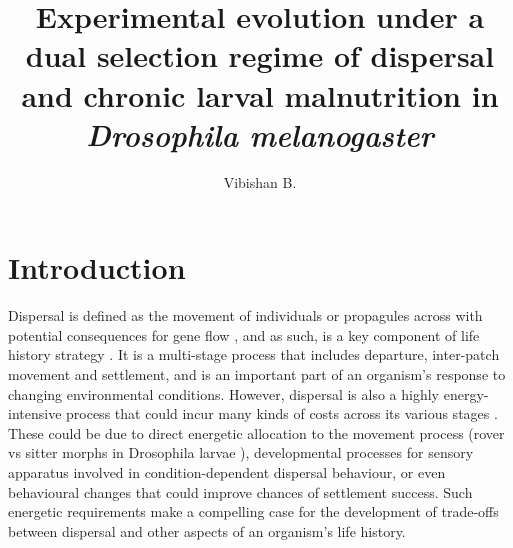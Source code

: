 \documentclass[12pt,onecolumn,twoside]{article}
\author{Vibishan B.}
\affil{Department of Biology, Indian Institute of Science Education and Research (IISER), Pune}
\title{Experimental evolution under a dual selection regime of dispersal and chronic larval malnutrition in \textit{Drosophila melanogaster}}
\date{\empty}
\begin{document}
	\maketitle
	\section{Introduction}

	Dispersal is defined as the movement of individuals or propagules across with potential consequences for gene flow \citep{Ronce2007}, and as such, is a key component of life history strategy \citep{Clobert2012, Bonte2017}. It is a multi-stage process that includes departure, inter-patch movement and settlement, and is an important part of an organism's response to changing environmental conditions. However, dispersal is also a highly energy-intensive process that could incur many kinds of costs across its various stages \citep{Bonte2012}. These could be due to direct energetic allocation to the movement process (rover vs sitter morphs in Drosophila larvae \cite{Vijendravarma2012}), developmental processes for sensory apparatus involved in condition-dependent dispersal behaviour, or even behavioural changes that could improve chances of settlement success. Such energetic requirements make a compelling case for the development of trade-offs between dispersal and other aspects of an organism's life history.
\end{document}
